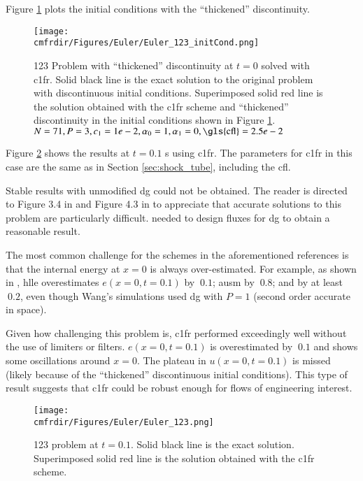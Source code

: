 Figure \ref{c1fr_123_initCond} plots the initial conditions with the ``thickened'' discontinuity.

\begin{figure}
\centering
\hspace{-1.25 cm}
\centering\texttt{[image: \\cmfrdir/Figures/Euler/Euler\_123\_initCond.png]}
  \caption{123 Problem with ``thickened'' discontinuity at $t = 0$ solved with \gls{c1fr}. Solid black line is the exact solution to the original problem with discontinuous initial conditions. Superimposed solid red line is the solution obtained with the \gls{c1fr} scheme and ``thickened'' discontinuity in the initial conditions shown in Figure \ref{c1fr_123_initCond}. $N=71, P=3,  c_1 = 1e-2, \alpha_0=1, \alpha_1 = 0, \mathrm{\gls{cfl}}=2.5e-2$}
  \label{c1fr_123_initCond}
\end{figure}

Figure \ref{c1fr_123} shows the results at $t=0.1$ s using \gls{c1fr}. The parameters for \gls{c1fr} in this case are the same as in Section \ref{sec:shock_tube}, including the \gls{cfl}. 



Stable results with unmodified \gls{dg} could not be obtained. The reader is directed to Figure 3.4 in \cite{wang2015arbitrary} and Figure 4.3 in \cite{hudson2006review} to appreciate that accurate solutions to this problem are particularly difficult. \cite{wang2015arbitrary} needed to design fluxes for \gls{dg} to obtain a reasonable result.

The most common challenge for the schemes in the aforementioned references is that the internal energy at $x=0$ is always over-estimated. For example, as shown in \cite{hudson2006review}, \gls{hlle} overestimates $e(x=0,t=0.1)$ by $~0.1$; \gls{ausm} by $~0.8$; and \cite{wang2015arbitrary} by at least $~0.2$, even though Wang's simulations used \gls{dg} with $P=1$ (second order accurate in space). 

Given how challenging this problem is, \gls{c1fr} performed exceedingly well without the use of limiters or filters. $e(x=0,t=0.1)$ is overestimated by $~0.1$ and shows some oscillations around $x=0$. The plateau in $u(x=0, t=0.1)$ is missed (likely because of the ``thickened'' discontinuous initial conditions). This type of result suggests that \gls{c1fr} could be robust enough for flows of engineering interest.
\begin{figure}
\centering
\hspace{-1.25 cm}
\centering\texttt{[image: \\cmfrdir/Figures/Euler/Euler\_123.png]}
  \caption{123 problem at $t = 0.1$. Solid black line is the exact solution. Superimposed solid red line is the solution obtained with the \gls{c1fr} scheme.}
  \label{c1fr_123}
\end{figure}